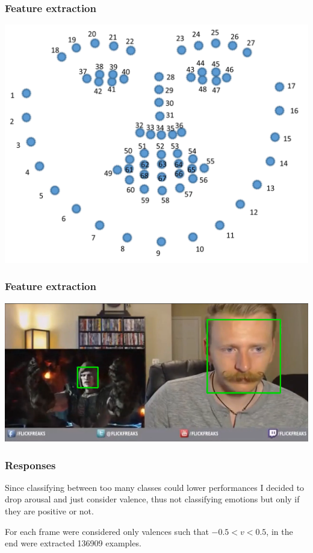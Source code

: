 \documentclass{beamer}
\begin{document}
\begin{frame}
    \frametitle{Feature extraction}
    \begin{center}
        \includegraphics[scale=0.15]{../paper/images/landmark.png}
    \end{center}
\end{frame}

\begin{frame}
    \frametitle{Feature extraction}
    \begin{center}
        \includegraphics[scale=0.3]{../paper/images/309mp4_double_face.png}
    \end{center}
\end{frame}

\begin{frame}
    \frametitle{Responses}
    Since classifying between too many classes could lower performances I decided to drop arousal and just consider valence, thus not classifying emotions but only if they are positive or not.

    For each frame were considered only valences such that $ -0.5 < v < 0.5$, in the end were extracted 136909 examples.
\end{frame}
\end{document}

